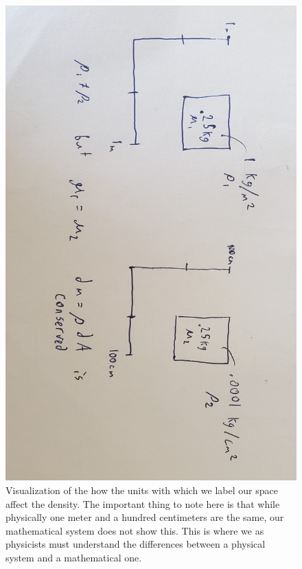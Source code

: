 \documentclass{article}
\begin{document}
	
\begin{figure}[!ht]
\centerline{\includegraphics[width=\textwidth,angle=90,scale=.45]{diagram5.jpg}}
\caption{Visualization of the how the units with which we label our space affect the density. The important thing to note here is that while physically one meter and a hundred centimeters are the same, our mathematical system does not show this. This is where we as physicists must understand the differences between a physical system and a mathematical one.}
\end{figure}
\end{document}
